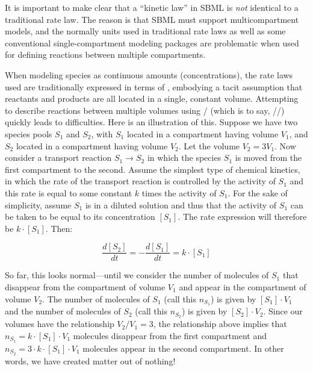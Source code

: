 
It is important to make clear that a ``kinetic law'' in SBML is
\emph{not} identical to a traditional rate law.  The reason is
that SBML must support multicompartment models, and the normally
units used in traditional rate laws as well as some conventional
single-compartment modeling packages are problematic when used for
defining reactions between multiple compartments.

When modeling species as continuous amounts (\eg concentrations),
the rate laws used are traditionally expressed in terms of
, embodying a
tacit assumption that reactants and products are all located in a
single, constant volume.  Attempting to describe reactions between
multiple volumes using /
(which is to say,
//) quickly
leads to difficulties.  Here is an illustration of this.  Suppose
we have two species pools $S_1$ and $S_2$, with $S_1$ located in a
compartment having volume $V_1$, and $S_2$ located in a
compartment having volume $V_2$.  Let the volume $V_2 = 3 V_1$.
Now consider a transport reaction $S_1 \rightarrow S_2$ in which
the species $S_1$ is moved from the first compartment to the
second.  Assume the simplest type of chemical kinetics, in which
the rate of the transport reaction is controlled by the activity
of $S_1$ and this rate is equal to some constant $k$ times the
activity of $S_1$.  For the sake of simplicity, assume $S_1$ is in
a diluted solution and thus that the activity of $S_1$ can be
taken to be equal to its concentration $[S_1]$.  The rate
expression will therefore be $k \cdot [S_1]$.  Then:
\begin{linenomath}
  \begin{equation*}
    \frac{d[S_2]}{dt} = -\frac{d[S_1]}{dt} = k \cdot [S_1]
  \end{equation*}
\end{linenomath}

So far, this looks normal---until we consider the number of
molecules of $S_1$ that disappear from the compartment of volume
$V_1$ and appear in the compartment of volume $V_2$.  The number
of molecules of $S_1$ (call this $n_{S_1}$) is given by $[S_1]
\cdot V_1$ and the number of molecules of $S_2$ (call this
$n_{S_2}$) is given by $[S_2] \cdot V_2$.  Since our volumes have
the relationship $V_2 / V_1 = 3$, the relationship above implies
that $n_{S_1} = k \cdot [S_1] \cdot V_1$ molecules disappear from
the first compartment  and $n_{S_2} = 3
\cdot k \cdot [S_1] \cdot V_1$ molecules appear in the second
compartment.  In other words, we have created matter out of
nothing!

